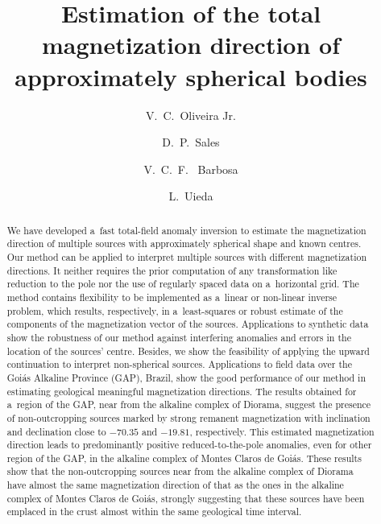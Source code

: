 \documentclass[journal abbreviation, npg]{copernicus}
\begin{document}
\linenumbers

\title{Estimation of the total magnetization direction of approximately spherical bodies}

\author[1]{V.~C.~Oliveira Jr.}
\author[1]{D.~P.~Sales}
\author[1]{V.~C.~F. ~Barbosa}
\author[1, 2]{L.~Uieda}





\published{}



\maketitle  %

\begin{abstract}
  We have developed a~fast total-field anomaly inversion to estimate
  the magnetization direction of multiple sources with approximately
  spherical shape and known centres. Our method can be applied to
  interpret multiple sources with different magnetization
  directions. It neither requires the prior computation of any
  transformation like reduction to the pole nor the use of regularly
  spaced data on a~horizontal grid. The method contains flexibility to
  be implemented as a~linear or non-linear inverse problem, which
  results, respectively, in a~least-squares or robust estimate of the
  components of the magnetization vector of the sources. Applications
  to synthetic data show the robustness of our method against
  interfering anomalies and errors in the location of the sources'
  centre. Besides, we show the feasibility of applying the upward
  continuation to interpret non-spherical sources. Applications to
  field data over the Goi\'{a}s Alkaline Province (GAP), Brazil, show
  the good performance of our method in estimating geological
  meaningful magnetization directions. The results obtained for
  a~region of the GAP, near from the alkaline complex of Diorama,
  suggest the presence of non-outcropping sources marked by strong
  remanent magnetization with inclination and declination close to
  $-70.35${\degree} and $-19.81${\degree}, respectively. This
  estimated magnetization direction leads to predominantly positive
  reduced-to-the-pole anomalies, even for other region of the GAP, in
  the alkaline complex of Montes Claros de Goi\'{a}s. These results show 
  that the non-outcropping sources near from the alkaline complex of 
  Diorama have almost the same magnetization direction of that as the 
  ones in the alkaline complex of Montes Claros de Goiás, strongly 
  suggesting that these sources have been emplaced in the crust almost 
  within the same geological time interval.
\end{abstract}
\end{document}
